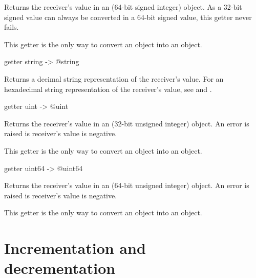 Returns the receiver's value in an  (64-bit signed integer) object. As a 32-bit signed value can always be converted in a 64-bit signed value, this getter never fails.

This getter is the only way to convert an  object into an  object.






\begin{galgas}
getter string -> @string
\end{galgas}

Returns a decimal string representation of the receiver's value. For an hexadecimal string representation of the receiver's value, see  and .








\begin{galgas}
getter uint -> @uint
\end{galgas}

Returns the receiver's value in an  (32-bit unsigned integer) object. An error is raised is receiver's value is negative.

This getter is the only way to convert an  object into an  object.





\begin{galgas}
getter uint64 -> @uint64
\end{galgas}

Returns the receiver's value in an  (64-bit unsigned integer) object. An error is raised is receiver's value is negative.

This getter is the only way to convert an  object into an  object.





\section{Incrementation and decrementation}

